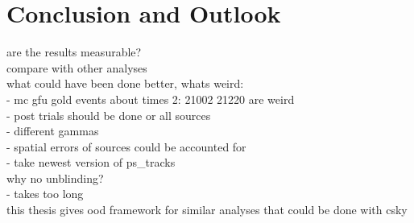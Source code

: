\chapter{Conclusion and Outlook}
are the results measurable?\\
compare with other analyses\\

what could have been done better, whats weird:\\
- mc gfu gold events about times 2: 21002 21220 are weird\\
- post trials should be done or all sources\\
- different gammas\\
- spatial errors of sources could be accounted for\\
- take newest version of ps\_tracks\\
why no unblinding?\\
- takes too long\\

this thesis gives ood framework for similar analyses that could be done with csky
